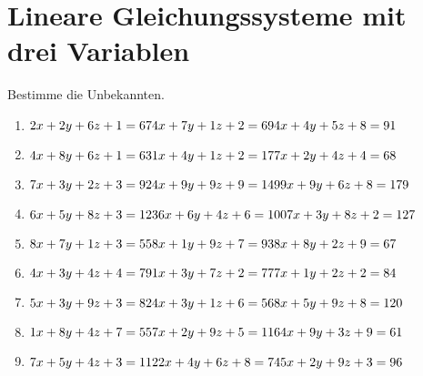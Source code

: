 \documentclass{article}%
\begin{document}
\section{Lineare Gleichungssysteme mit drei Variablen}%
\label{sec:LineareGleichungssystememitdreiVariablen}%
Bestimme die Unbekannten.%
\begin{enumerate}[label=\alph*)]%
\item%
\newline\vspace{0.5cm} $2x+2y+6z+1=67\newline4x+7y+1z+2=69\newline4x+4y+5z+8=91\newline$%
\item%
\newline\vspace{0.5cm} $4x+8y+6z+1=63\newline1x+4y+1z+2=17\newline7x+2y+4z+4=68\newline$%
\item%
\newline\vspace{0.5cm} $7x+3y+2z+3=92\newline4x+9y+9z+9=149\newline9x+9y+6z+8=179\newline$%
\item%
\newline\vspace{0.5cm} $6x+5y+8z+3=123\newline6x+6y+4z+6=100\newline7x+3y+8z+2=127\newline$%
\item%
\newline\vspace{0.5cm} $8x+7y+1z+3=55\newline8x+1y+9z+7=93\newline8x+8y+2z+9=67\newline$%
\item%
\newline\vspace{0.5cm} $4x+3y+4z+4=79\newline1x+3y+7z+2=77\newline7x+1y+2z+2=84\newline$%
\item%
\newline\vspace{0.5cm} $5x+3y+9z+3=82\newline4x+3y+1z+6=56\newline8x+5y+9z+8=120\newline$%
\item%
\newline\vspace{0.5cm} $1x+8y+4z+7=55\newline7x+2y+9z+5=116\newline4x+9y+3z+9=61\newline$%
\item%
\newline\vspace{0.5cm} $7x+5y+4z+3=112\newline2x+4y+6z+8=74\newline5x+2y+9z+3=96\newline$%

\end{enumerate}
\end{document}
